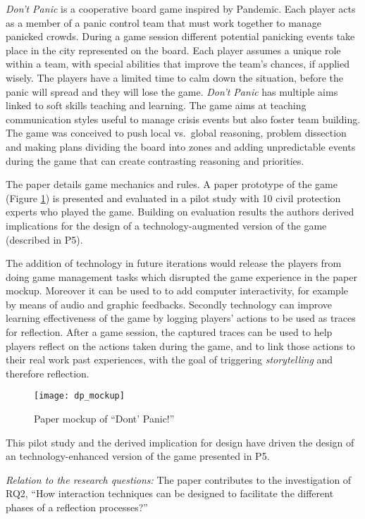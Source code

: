 \emph{Don't Panic} is a cooperative board game inspired by Pandemic. Each player acts as a member of a panic control team that must work together to manage panicked crowds. During a game session different potential panicking events take place in the city represented on the board. Each player assumes a unique role within a team, with special abilities that improve the team's chances, if applied wisely. The players have a limited time to calm down the situation, before the panic will spread and they will lose the game. \emph{Don't Panic} has multiple aims linked to soft skills teaching and learning. The game aims at teaching communication styles useful to manage crisis events but also foster team building. The game was conceived to push local vs.~global reasoning, problem dissection and making plans dividing the board into zones and adding unpredictable events during the game that can create contrasting reasoning and priorities.

The paper details game mechanics and rules. A paper prototype of the game (Figure \ref{fig:dp-mockup}) is presented and evaluated in a pilot study with 10 civil protection experts who played the game. Building on evaluation results the authors derived implications for the design of a technology-augmented version of the game (described in P5).

The addition of technology in future iterations would release the players from doing game management tasks which disrupted the game experience in the paper mockup. Moreover it can be used to to add computer interactivity, for example by means of audio and graphic feedbacks. Secondly technology can improve learning effectiveness of the game by logging players' actions to be used as traces for reflection. After a game session, the captured traces can be used to help players reflect on the actions taken during the game, and to link those actions to their real work past experiences, with the goal of triggering \emph{storytelling} and therefore reflection.
\begin{figure}
	[tbh] \centering 
	\texttt{[image: dp\_mockup]} \caption{Paper mockup of “Dont’ Panic!”} \label{fig:dp-mockup} 
\end{figure}

This pilot study and the derived implication for design have driven the design of an technology-enhanced version of the game presented in P5.

\emph{Relation to the research questions: } The paper contributes to the investigation of RQ2, ``How interaction techniques can be designed to facilitate the different phases of a reflection processes?''

